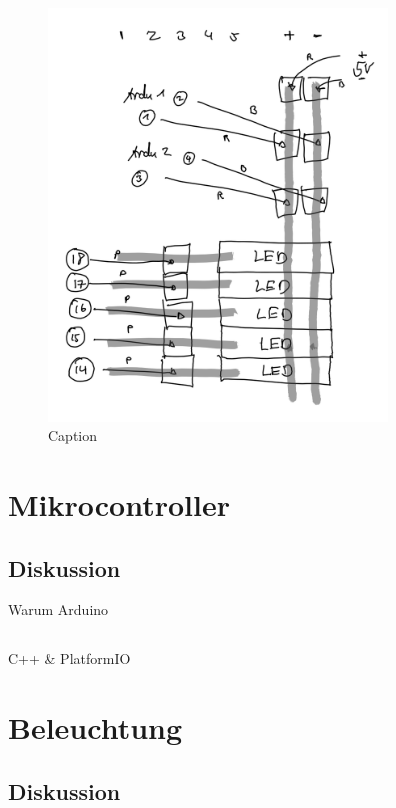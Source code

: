     \begin{figure}[h]
        \begin{center}
            \includegraphics[width=9cm]{sketches/header_2.png}
        \end{center}
        \caption{Caption}
        \label{fig:header_2}
    \end{figure}




\section{Mikrocontroller}
    \subsection{Diskussion}
        Warum Arduino

    \subsection{}
        C++ \& PlatformIO

\section{Beleuchtung}
    \subsection{Diskussion}

